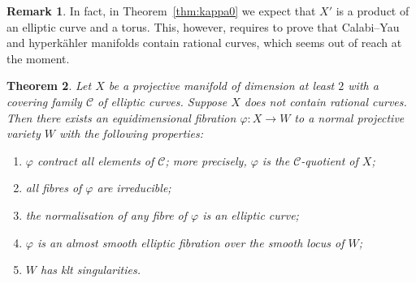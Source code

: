 \documentclass[11pt]{article}
\newtheorem{theo}{Theorem}[section]
\theoremstyle{definition}
\newtheorem{rema}[theo]{Remark}
\numberwithin{equation}{section}
\numberwithin{figure}{section}
\numberwithin{table}{section}
\newcommand\sC{\mathcal{C}}
\newcommand*{\romanenumi}{\renewcommand*{\theenumi}{\roman{enumi}}}
\begin{document}
\begin{rema}\label{rema:main6.11} 
In fact, in Theorem~\ref{thm:kappa0} we expect that $X'$ is a product of an elliptic curve and a torus. This, however, requires to prove that Calabi--Yau and hyperkähler manifolds contain rational curves, which seems out of reach at the moment.
\end{rema}


\begin{theo}\label{thm:ratcurves}
Let $X$ be a projective manifold of dimension at least $2$ with a covering family $\sC$ of elliptic curves. Suppose $X$ does not contain rational curves. Then there exists an equidimensional fibration $\varphi\colon X \to W$ to a normal projective variety $W$ with the following properties:
\begin{enumerate}\romanenumi
\item \label{list-6.12.1}$\varphi$ contract all elements of $\sC$; more precisely, $\varphi$ is the $\sC$-quotient of $X$;
\item \label{list-6.12.2}all fibres of $\varphi$ are irreducible;
\item \label{list-6.12.3}the normalisation of any fibre of $\varphi$ is an elliptic curve;
\item \label{list-6.12.4}$\varphi$ is an almost smooth elliptic fibration over the smooth locus of $W$;
\item \label{list-6.12.5}$W$ has klt singularities.
\end{enumerate}
\end{theo}
\end{document}
